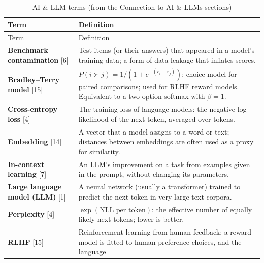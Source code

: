 \begin{longtable}[]{@{}
  >{\raggedright\arraybackslash}p{}
  >{\raggedright\arraybackslash}p{}@{}}
\caption{\centering AI \& LLM terms (from the Connection to AI \& LLMs sections)}\tabularnewline
\toprule\noalign{}
\begin{minipage}[b]{\linewidth}\raggedright
Term
\end{minipage} & \begin{minipage}[b]{\linewidth}\raggedright
Definition
\end{minipage} \\
\midrule\noalign{}
\endfirsthead
\toprule\noalign{}
\begin{minipage}[b]{\linewidth}\raggedright
Term
\end{minipage} & \begin{minipage}[b]{\linewidth}\raggedright
Definition
\end{minipage} \\
\midrule\noalign{}
\endhead
\bottomrule\noalign{}
\endlastfoot
\textbf{Benchmark contamination} {[}6{]} & Test items (or their answers)
that appeared in a model's training data; a form of data leakage that
inflates scores. \\
\textbf{Bradley--Terry model} {[}15{]} &
\(P(i \succ j) = 1/(1 + e^{-(r_i - r_j)})\): choice model for paired
comparisons; used for RLHF reward models. Equivalent to a two-option
softmax with \(\beta = 1\). \\
\textbf{Cross-entropy loss} {[}4{]} & The training loss of language
models: the negative log-likelihood of the next token, averaged over
tokens. \\
\textbf{Embedding} {[}14{]} & A vector that a model assigns to a word or
text; distances between embeddings are often used as a proxy for
similarity. \\
\textbf{In-context learning} {[}7{]} & An LLM's improvement on a task
from examples given in the prompt, without changing its parameters. \\
\textbf{Large language model (LLM)} {[}1{]} & A neural network (usually
a transformer) trained to predict the next token in very large text
corpora. \\
\textbf{Perplexity} {[}4{]} & \(\exp(\text{NLL per token})\): the
effective number of equally likely next tokens; lower is better. \\
\textbf{RLHF} {[}15{]} & Reinforcement learning from human feedback: a
reward model is fitted to human preference choices, and the language

\end{longtable}
